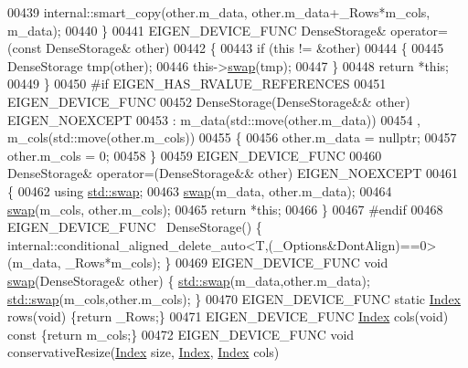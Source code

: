 \begin{DoxyCode}
00439       internal::smart\_copy(other.m\_data, other.m\_data+\_Rows*m\_cols, m\_data);
00440     \}
00441     EIGEN\_DEVICE\_FUNC DenseStorage& operator=(\textcolor{keyword}{const} DenseStorage& other)
00442     \{
00443       \textcolor{keywordflow}{if} (\textcolor{keyword}{this} != &other)
00444       \{
00445         DenseStorage tmp(other);
00446         this->\hyperlink{endian_8c_a3ca5ecd34b04d6a243c054ac3a57f68d}{swap}(tmp);
00447       \}
00448       \textcolor{keywordflow}{return} *\textcolor{keyword}{this};
00449     \}    
00450 \textcolor{preprocessor}{#if EIGEN\_HAS\_RVALUE\_REFERENCES}
00451     EIGEN\_DEVICE\_FUNC
00452     DenseStorage(DenseStorage&& other) EIGEN\_NOEXCEPT
00453       : m\_data(std::move(other.m\_data))
00454       , m\_cols(std::move(other.m\_cols))
00455     \{
00456       other.m\_data = \textcolor{keyword}{nullptr};
00457       other.m\_cols = 0;
00458     \}
00459     EIGEN\_DEVICE\_FUNC
00460     DenseStorage& operator=(DenseStorage&& other) EIGEN\_NOEXCEPT
00461     \{
00462       \textcolor{keyword}{using} \hyperlink{endian_8c_a3ca5ecd34b04d6a243c054ac3a57f68d}{std::swap};
00463       \hyperlink{endian_8c_a3ca5ecd34b04d6a243c054ac3a57f68d}{swap}(m\_data, other.m\_data);
00464       \hyperlink{endian_8c_a3ca5ecd34b04d6a243c054ac3a57f68d}{swap}(m\_cols, other.m\_cols);
00465       \textcolor{keywordflow}{return} *\textcolor{keyword}{this};
00466     \}
00467 \textcolor{preprocessor}{#endif}
00468     EIGEN\_DEVICE\_FUNC ~DenseStorage() \{ 
      internal::conditional\_aligned\_delete\_auto<T,(\_Options&DontAlign)==0>(m\_data, \_Rows*m\_cols); \}
00469     EIGEN\_DEVICE\_FUNC \textcolor{keywordtype}{void} \hyperlink{endian_8c_a3ca5ecd34b04d6a243c054ac3a57f68d}{swap}(DenseStorage& other) \{ \hyperlink{endian_8c_a3ca5ecd34b04d6a243c054ac3a57f68d}{std::swap}(m\_data,other.m\_data); 
      \hyperlink{endian_8c_a3ca5ecd34b04d6a243c054ac3a57f68d}{std::swap}(m\_cols,other.m\_cols); \}
00470     EIGEN\_DEVICE\_FUNC \textcolor{keyword}{static} \hyperlink{namespace_eigen_a62e77e0933482dafde8fe197d9a2cfde}{Index} rows(\textcolor{keywordtype}{void}) \{\textcolor{keywordflow}{return} \_Rows;\}
00471     EIGEN\_DEVICE\_FUNC \hyperlink{namespace_eigen_a62e77e0933482dafde8fe197d9a2cfde}{Index} cols(\textcolor{keywordtype}{void})\textcolor{keyword}{ const }\{\textcolor{keywordflow}{return} m\_cols;\}
00472     EIGEN\_DEVICE\_FUNC \textcolor{keywordtype}{void} conservativeResize(\hyperlink{namespace_eigen_a62e77e0933482dafde8fe197d9a2cfde}{Index} size, \hyperlink{namespace_eigen_a62e77e0933482dafde8fe197d9a2cfde}{Index}, \hyperlink{namespace_eigen_a62e77e0933482dafde8fe197d9a2cfde}{Index} cols)

\end{DoxyCode}
